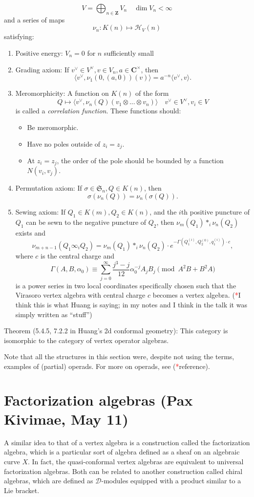 \documentclass{article}
\newcommand{\CC}{\mathbold{C}}
\newcommand{\ZZ}{\mathbold{Z}}
\newcommand{\Hh}{\mathcal{H}}
\newcommand{\Dd}{\mathcal{D}}
\newcommand{\tk}{\textcolor{red}{*}}
\newcommand{\Sym}{\mathfrak{S}}
\begin{document}
\[V = \bigoplus_{n \in \ZZ} V_n \quad \dim V_n < \infty \]
and a series of maps
\[\nu_n: K(n) \mapsto \Hh_V(n) \]
satisfying:
\begin{enumerate}
\item Positive energy: $V_n=0$ for $n$ sufficiently small
\item Grading axiom: If $v^\vee \in V^\vee, v \in V_n, a \in \CC^\times$, then
  \[\langle v^\vee,\nu_1(0,(a,0))(v)\rangle = a^{-n}\langle v^\vee,v \rangle. \]
\item Meromorphicity: A function on $K(n)$ of the form
  \[Q \mapsto \langle v^\vee, \nu_n(Q)(v_1 \otimes ... \otimes v_n) \rangle \quad v^\vee \in V^\vee, v_i \in V \]
  is called a \textit{correlation function}.  These functions should:
  \begin{itemize}
  \item Be meromorphic.
  \item Have no poles outside of $z_i=z_j$.
  \item At $z_i=z_j$, the order of the pole should be bounded by a function $N(v_i,v_j)$.
  \end{itemize}
\item Permutation axiom: If $\sigma \in \Sym_n, Q \in K(n)$, then
\[\sigma(\nu_n(Q))=\nu_n(\sigma(Q)). \]
\item Sewing axiom: If $Q_1 \in K(m), Q_2 \in K(n)$, and the $i$th positive puncture of $Q_1$ can be sewn to the negative puncture of $Q_2$, then $\nu_m(Q_1) *_i \nu_n(Q_2)$ exists and
\[\nu_{m+n-1}(Q_1 \infty_i Q_2) = \nu_m(Q_1) *_i \nu_n(Q_2) \cdot e^{-\Gamma(Q_1^{(i)},Q_2^{(0)},q_1^{(i)}) \cdot c}, \]
where $c$ is the central charge and
\[\Gamma(A,B,\alpha_0) \equiv \sum_{j=0}^\infty\frac{j^3-j}{12}\alpha_0^{-j}A_jB_j \pmod{A^2B+B^2A} \]
is a power series in two local coordinates specifically chosen such that the Virasoro vertex algebra with central charge $c$ becomes a vertex algebra. (\tk I think this is what Huang is saying; in my notes and I think in the talk it was simply written as ``stuff'') 
\end{enumerate}
Theorem (5.4.5, 7.2.2 in Huang's 2d conformal geometry): This category is isomorphic to the category of vertex operator algebras.

Note that all the structures in this section were, despite not using the terms, examples of (partial) operads. For more on operads, see (\tk reference).
\section{Factorization algebras (Pax Kivimae, May 11)}
A similar idea to that of a vertex algebra is a construction called the factorization algebra, which is a particular sort of algebra defined as a sheaf on an algebraic curve $X$.  In fact, the quasi-conformal vertex algebras are equivalent to universal factorization algebras.  Both can be related to another construction called chiral algebras, which are defined as $\Dd$-modules equipped with a product similar to a Lie bracket.
\end{document}
